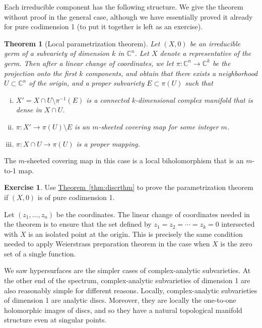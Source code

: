 \documentclass[12pt,openany]{book}
\newcommand{\C}{{\mathbb{C}}}
\newcommand{\myindex}[1]{#1\index{#1}}
\theoremstyle{plain}
\newtheorem{thm}{Theorem}[section]
\theoremstyle{remark}
\theoremstyle{definition}
\newenvironment{exbox}{%
    \def\FrameCommand{\vrule width 1pt \relax\hspace{10pt}}%
    \MakeFramed {\advance \hsize -\width \FrameRestore}%
}{%
    \endMakeFramed
}
\theoremstyle{exercise}
\newtheorem{exercise}{Exercise}[section]
\theoremstyle{example}
\newcommand{\thmref}[1]{\hyperref[#1]{Theorem~\ref*{#1}}}
\begin{document}
Each irreducible component has the following structure.
We give the theorem without proof in the general case, although we have
essentially proved it already for pure codimension 1 (to put it
together is left as an exercise).

\begin{thm}[\myindex{Local parametrization theorem}]
\pagebreak[2]
\label{localparthm}
Let $(X,0)$ be an irreducible germ of a subvariety of dimension $k$
in $\C^n$.  Let $X$ denote a representative of the germ.
Then after a linear change of coordinates, we let
$\pi \colon \C^n \to \C^k$ be the projection onto the first $k$
components, and obtain that there exists a neighborhood $U \subset \C^n$
of the origin, and a proper subvariety $E \subset \pi(U)$ such that
\begin{enumerate}[(i)]
\item $X' = X \cap U \setminus \pi^{-1}(E)$ is a connected
$k$-dimensional complex manifold that is dense in $X \cap U$.
\item $\pi \colon X' \to \pi(U) \setminus E$ is an $m$-sheeted covering map
for some integer $m$.
\item $\pi \colon X \cap U \to \pi(U)$ is a proper mapping.
\pagebreak[3]
\end{enumerate}
\end{thm}

The $m$-sheeted covering map in this case is a local biholomorphism
that is an $m$-to-1 map.

\begin{exbox}
\begin{exercise}
Use \thmref{thm:discrthm}
to prove the parametrization theorem if $(X,0)$ is
of pure codimension 1.
\end{exercise}
\end{exbox}

Let $(z_1,\ldots,z_n)$ be the coordinates.
The linear change of coordinates needed in the theorem is
to ensure that the set defined by $z_1=z_2=\cdots=z_k = 0$ intersected
with $X$ is an isolated point at the origin.  This is precisely
the same condition needed to apply Weierstrass preparation theorem in the case
when $X$ is the zero set of a single function.

\medskip

We saw hypersurfaces are the simpler cases of complex-analytic
subvarieties.  At the other end of the spectrum, complex-analytic
subvarieties of dimension 1 are also reasonably simple for different reasons.
Locally, complex-analytic subvarieties of dimension 1 are analytic discs.
Moreover, they are locally the one-to-one holomorphic images of discs,
and so they have a natural topological manifold structure even at singular
points.
\end{document}
